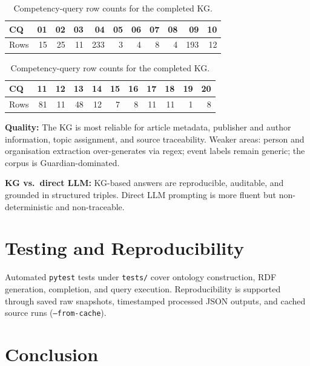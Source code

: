 \documentclass[runningheads]{llncs}
\newcommand{\filepath}[1]{%
  \begingroup\hypersetup{urlcolor=black}\nolinkurl{#1}\endgroup}
\newcommand{\code}[1]{\texttt{#1}}
\begin{document}
\begin{table}[t]
\centering
\caption{Competency-query row counts for the completed KG.}
\label{tab:queries}
\begin{tabular}{@{}lrrrrrrrrrr@{}}
\toprule
CQ & 01 & 02 & 03 & 04 & 05 & 06 & 07 & 08 & 09 & 10 \\
\midrule
Rows & 15 & 25 & 11 & 233 & 3 & 4 & 8 & 4 & 193 & 12 \\
\bottomrule
\end{tabular}

\vspace{0.5em}

\begin{tabular}{@{}lrrrrrrrrrr@{}}
\toprule
CQ & 11 & 12 & 13 & 14 & 15 & 16 & 17 & 18 & 19 & 20 \\
\midrule
Rows & 81 & 11 & 48 & 12 & 7 & 8 & 11 & 11 & 1 & 8 \\
\bottomrule
\end{tabular}
\end{table}

\textbf{Quality:} The KG is most reliable for article metadata, publisher and author
information, topic assignment, and source traceability. Weaker areas: person and
organisation extraction over-generates via regex; event labels remain generic; the
corpus is Guardian-dominated.

\textbf{KG vs.\ direct LLM:} KG-based answers are reproducible, auditable, and grounded
in structured triples. Direct LLM prompting is more fluent but non-deterministic and
non-traceable.

\section{Testing and Reproducibility}\label{sec:testing}

Automated \code{pytest} tests under \filepath{tests/} cover ontology construction,
RDF generation, completion, and query execution. Reproducibility is supported through
saved raw snapshots, timestamped processed JSON outputs, and cached source runs
(\code{--from-cache}).

\section{Conclusion}\label{sec:conclusion}
\end{document}
